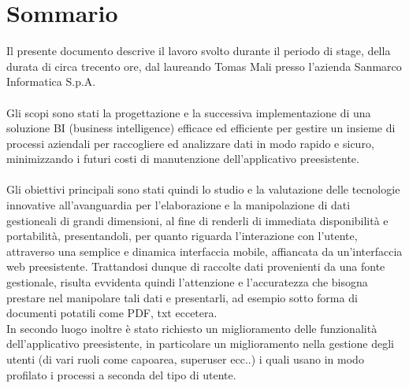
\cleardoublepage
{}
{}
\begingroup
\let\clearpage\relax
\let\cleardoublepage\relax
\let\cleardoublepage\relax

\chapter*{Sommario}

Il presente documento descrive il lavoro svolto durante il periodo di stage, della durata di circa trecento ore, dal laureando Tomas Mali presso l'azienda Sanmarco Informatica S.p.A.\\ \\

Gli scopi sono stati la progettazione e la successiva implementazione di una soluzione BI (business intelligence) efficace ed efficiente per gestire un insieme di processi aziendali per raccogliere ed analizzare dati in modo rapido e sicuro, minimizzando i futuri costi di manutenzione dell’applicativo preesistente.\\\\

Gli obiettivi principali sono stati quindi lo studio e la valutazione delle tecnologie innovative all'avanguardia per l'elaborazione e la manipolazione di dati gestioneali di grandi dimensioni, al fine di renderli di immediata disponibilità e portabilità, presentandoli, per quanto riguarda l'interazione con l'utente, attraverso una semplice e dinamica interfaccia mobile, affiancata da un'interfaccia web preesistente. Trattandosi dunque di raccolte dati provenienti da una fonte gestionale, risulta evvidenta quindi l'attenzione e l'accuratezza  che bisogna prestare nel manipolare tali dati e presentarli, ad esempio sotto forma di documenti potatili come PDF, txt eccetera.\\ 
In secondo luogo inoltre è stato richiesto un miglioramento delle funzionalità dell'applicativo preesistente, in particolare un miglioramento nella gestione degli utenti (di vari ruoli come capoarea, superuser ecc..) i quali usano in modo profilato i processi a seconda del tipo di utente.

%
%

\endgroup			

\vfill

